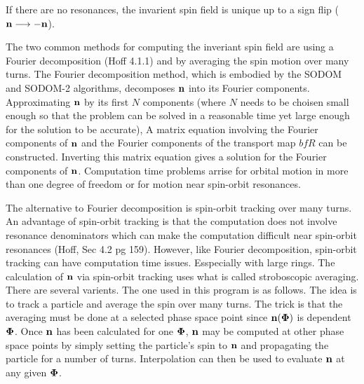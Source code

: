 \documentclass[11pt,openany]{report}
\newcommand{\Bf}[1]{{\bf #1}}
\newcommand{\bfn}{{\Bf n}}
\newcommand{\bfPhi}{{\Bf \Phi}}
\begin{document}
If there are no resonances, the invarient spin field is unique up to a sign flip ($\bfn
\longrightarrow -\bfn$).

The two common methods for computing the inveriant spin field are using a Fourier decomposition
(Hoff 4.1.1) and by averaging the spin motion over many turns. The Fourier decomposition method,
which is embodied by the SODOM and SODOM-2 algorithms, decomposes $\bfn$ into its Fourier
components. Approximating $\bfn$ by its first $N$ components (where $N$ needs to be choisen small
enough so that the problem can be solved in a reasonable time yet large enough for the solution to
be accurate), A matrix equation involving the Fourier components of $\bfn$ and the Fourier
components of the transport map $bfR$ can be constructed. Inverting this matrix equation gives a
solution for the Fourier components of $\bfn$. Computation time problems arrise for orbital motion
in more than one degree of freedom or for motion near spin-orbit resonances.

The alternative to Fourier decomposition is spin-orbit tracking over many turns. An advantage of
spin-orbit tracking is that the computation does not involve resonance denominators which can make
the computation difficult near spin-orbit resonances (Hoff, Sec 4.2 pg 159). However, like Fourier
decomposition, spin-orbit tracking can have computation time issues. Esspecially with large
rings. The calculation of $\bfn$ via spin-orbit tracking uses what is called stroboscopic averaging.
There are several varients. The one used in this program is as follows. The idea is to track a
particle and average the spin over many turns. The trick is that the averaging must be done at a
selected phase space point since $\bfn(\bfPhi)$ is dependent $\bfPhi$. Once $\bfn$ has been
calculated for one $\bfPhi$, $\bfn$ may be computed at other phase space points by simply setting
the particle's spin to $\bfn$ and propagating the particle for a number of turns. Interpolation can
then be used to evaluate $\bfn$ at any given $\bfPhi$.
\end{document}
